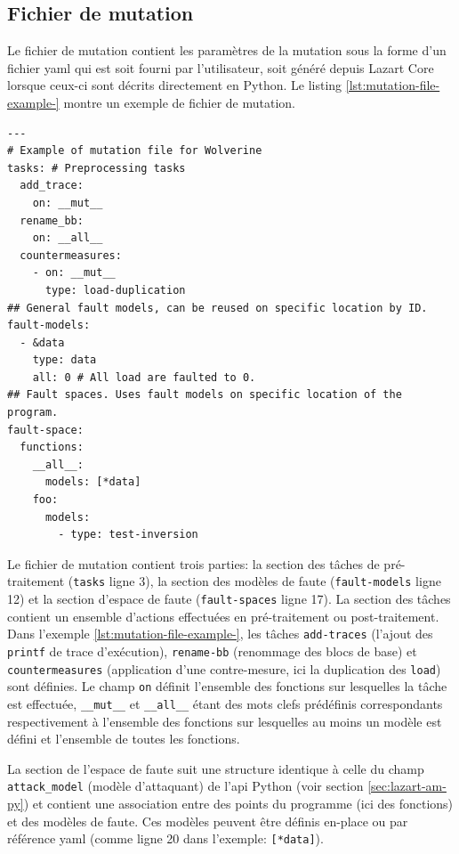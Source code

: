         \subsection{Fichier de mutation}
            \label{sec:lazart-impl-mutation-file}
            
            Le fichier de mutation contient les paramètres de la mutation sous la forme d'un fichier \gls{yaml} qui est soit fourni par l'utilisateur, soit généré depuis Lazart Core lorsque ceux-ci sont décrits directement en Python. Le listing \ref{lst:mutation-file-example-} montre un exemple de fichier de mutation.
                
\begin{lstlisting}  
---
# Example of mutation file for Wolverine
tasks: # Preprocessing tasks
  add_trace: 
    on: __mut__
  rename_bb: 
    on: __all__
  countermeasures:
    - on: __mut__
      type: load-duplication
## General fault models, can be reused on specific location by ID.
fault-models:
  - &data
    type: data
    all: 0 # All load are faulted to 0.
## Fault spaces. Uses fault models on specific location of the program.
fault-space:
  functions:
    __all__:
      models: [*data]
    foo:
      models: 
        - type: test-inversion
\end{lstlisting} 

            Le fichier de mutation contient trois parties: la section des tâches de pré-traitement (\texttt{tasks} ligne 3), la section des modèles de faute (\texttt{fault-models} ligne 12) et la section d'espace de faute (\texttt{fault-spaces} ligne 17). 
            La section des tâches contient un ensemble d'actions effectuées en pré-traitement ou post-traitement. Dans l'exemple \ref{lst:mutation-file-example-}, les tâches \texttt{add-traces} (l'ajout des \texttt{printf} de trace d'exécution), \texttt{rename-bb} (renommage des blocs de base) et \texttt{countermeasures} (application d'une contre-mesure, ici la duplication des \texttt{load}) sont définies. Le champ \texttt{on} définit l'ensemble des fonctions sur lesquelles la tâche est effectuée, \texttt{\_\_mut\_\_} et \texttt{\_\_all\_\_} étant des mots clefs prédéfinis correspondants respectivement à l'ensemble des fonctions sur lesquelles au moins un modèle est défini et l'ensemble de toutes les fonctions.
            
            La section de l'espace de faute suit une structure identique à celle du champ \texttt{attack\_model} (modèle d'attaquant) de l'\gls{api} Python (voir section \ref{sec:lazart-am-py}) et contient une association entre des points du programme (ici des fonctions) et des modèles de faute. Ces modèles peuvent être définis en-place ou par référence \gls{yaml} (comme ligne 20 dans l'exemple: \texttt{[*data]}).

